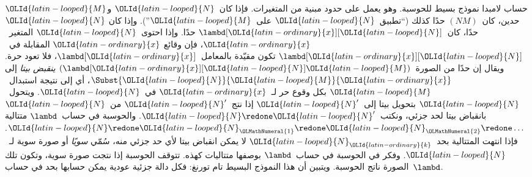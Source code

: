 \documentclass[../../../include/open-logic-section]{subfiles}
\begin{document}


حساب لامبدا نموذج بسيط للحوسبة. وهو يعمل على حدود مبنية من المتغيرات. فإذا
كان~$\OLId{latin-looped}{N}$ و$\OLId{latin-looped}{M}$ حدين، كان~$(NM)$ حدًا كذلك (``تطبيق~$\OLId{latin-looped}{N}$ على~$\OLId{latin-looped}{M}$''). وإذا كان
$\OLId{latin-looped}{N}$ حدًا، كان~$\lambd[\OLId{latin-ordinary}{x}][\OLId{latin-looped}{N}]$ حدًا. وإذا احتوى~$\OLId{latin-looped}{N}$ المتغير~$\OLId{latin-ordinary}{x}$، فإن وقائع
$\OLId{latin-ordinary}{x}$ المقابلة في~$\lambd[\OLId{latin-ordinary}{x}][\OLId{latin-looped}{N}]$ تكون مقيّدة بالمعامل~$\lambd[\OLId{latin-ordinary}{x}]$، فلا تعود
حرة. ويقال إن حدًا من الصورة~$(\lambd[\OLId{latin-ordinary}{x}][\OLId{latin-looped}{N}]\OLId{latin-looped}{M})$ \emph{ينقبض بيتا} إلى
$\Subst{\OLId{latin-looped}{N}}{\OLId{latin-looped}{M}}{\OLId{latin-ordinary}{x}}$، أي إلى نتيجة استبدال~$\OLId{latin-looped}{M}$ بكل وقوع حر لـ~$\OLId{latin-ordinary}{x}$ في~$\OLId{latin-looped}{N}$.
ويتحول~$\OLId{latin-looped}{N}$ بتحويل بيتا إلى~$\OLId{latin-looped}{N}'$ إذا نتج~$\OLId{latin-looped}{N}'$ من~$\OLId{latin-looped}{N}$ بانقباض بيتا لحد جزئي،
ونكتب~$\OLId{latin-looped}{N}\redone \OLId{latin-looped}{N}'$. والحوسبة في حساب~$\lambd$ متتالية
$\OLId{latin-looped}{N}\redone \OLId{latin-looped}{N}_\OLMathNumeral{1}\redone \OLId{latin-looped}{N}_\OLMathNumeral{2}\redone\dots$. فإذا انتهت المتتالية بحد~$\OLId{latin-looped}{N}_\OLId{latin-ordinary}{k}$ لا
يمكن انقباض بيتا لأي حد جزئي منه، سُمّي \emph{سويًا} أو صورة سوية لـ~$\OLId{latin-looped}{N}$.
وفكر في الحوسبة في حساب~$\lambd$ بوصفها متتاليات كهذه. تتوقف الحوسبة إذا
نتجت صورة سوية، وتكون تلك الصورة ناتج الحوسبة. ويتبين أن هذا النموذج البسيط
تام تورنغ: فكل دالة جزئية عودية يمكن حسابها بحد في حساب~$\lambd$.
\end{document}

